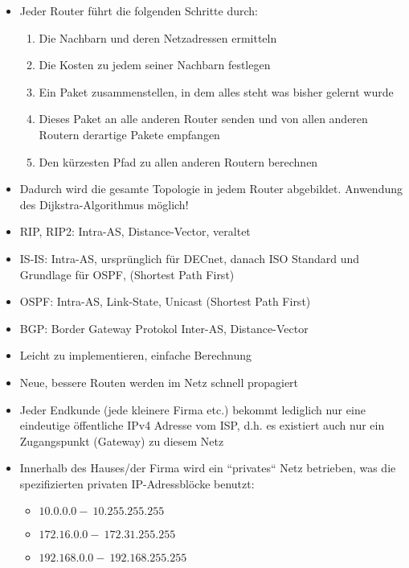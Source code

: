 \begin{itemize}
    \item Jeder Router führt die folgenden Schritte durch:
    \begin{enumerate}
        \item Die Nachbarn und deren Netzadressen ermitteln
        \item Die Kosten zu jedem seiner Nachbarn festlegen
        \item Ein Paket zusammenstellen, in dem alles steht was bisher gelernt wurde
        \item Dieses Paket an alle anderen Router senden und von allen anderen Routern derartige Pakete empfangen
        \item Den kürzesten Pfad zu allen anderen Routern berechnen
    \end{enumerate}
    \item Dadurch wird die gesamte Topologie in jedem Router abgebildet.
    Anwendung des Dijkstra-Algorithmus möglich!
\end{itemize}

\begin{itemize}
    \item RIP, RIP2: Intra-AS, Distance-Vector, veraltet
    \item IS-IS: Intra-AS, ursprünglich für DECnet, danach ISO Standard und Grundlage für OSPF, (Shortest Path First)
    \item OSPF: Intra-AS, Link-State, Unicast (Shortest Path First)
    \item BGP: Border Gateway Protokol Inter-AS, Distance-Vector
\end{itemize}

\begin{itemize}
    \item Leicht zu implementieren, einfache Berechnung
    \item Neue, bessere Routen werden im Netz schnell propagiert
\end{itemize}

\begin{itemize}
    \item Jeder Endkunde (jede kleinere Firma etc.) bekommt lediglich nur eine eindeutige öffentliche IPv4 Adresse vom ISP, d.h. es existiert auch nur ein Zugangspunkt (Gateway) zu diesem Netz
    \item Innerhalb des Hauses/der Firma wird ein ``privates`` Netz betrieben, was die spezifizierten privaten IP-Adressblöcke benutzt:
    \begin{itemize}
        \item \( 10.0.0.0 -\: 10.255.255.255 \)
        \item \( 172.16.0.0 -\: 172.31.255.255 \)
        \item \( 192.168.0.0 -\: 192.168.255.255 \)
    \end{itemize}
\end{itemize}

